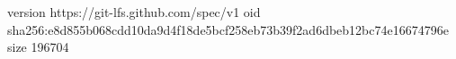 version https://git-lfs.github.com/spec/v1
oid sha256:e8d855b068cdd10da9d4f18de5bcf258eb73b39f2ad6dbeb12bc74e16674796e
size 196704
